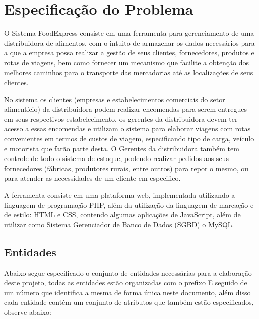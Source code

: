 \documentclass[12pt, onecolumn, titlepage]{article}
\begin{document}
\section{Especificação do Problema}
\label{sect:especificacao}

O Sistema FoodExpress consiste em uma ferramenta para gerenciamento de uma distribuidora de alimentos, com o intuito de armazenar os dados necessários para a que a empresa possa realizar a gestão de seus clientes, fornecedores, produtos e rotas de viagens, bem como fornecer um mecanismo que facilite a obtenção dos melhores caminhos para o transporte das mercadorias até as localizações de seus clientes.

No sistema os clientes (empresas e estabelecimentos comerciais do setor alimentício) da distribuidora podem realizar encomendas para serem entregues em seus respectivos estabelecimento, os gerentes da distribuidora devem ter acesso a essas encomendas e utilizam o sistema para elaborar viagens com rotas convenientes em termos de custos de viagem, especificando tipo de carga, veículo e motorista que farão parte desta. O Gerentes da distribuidora também tem controle de todo o sistema de estoque, podendo realizar pedidos aos seus fornecedores (fábricas, produtores rurais, entre outros) para repor o mesmo, ou para atender as necessidades de um cliente em especifico.

A ferramenta consiste em uma plataforma web, implementada utilizando a linguagem de programação PHP, além da utilização da linguagem de marcação e de estilo: HTML e CSS, contendo algumas aplicações de JavaScript, além de utilizar como Sistema Gerenciador de Banco de Dados (SGBD) o MySQL.

\subsection{Entidades}
\label{sect:entidades}

Abaixo segue especificado o conjunto de entidades necessárias para a elaboração deste projeto, todas as entidades estão organizadas com o prefixo E seguido de um número que identifica a mesma de forma única neste documento, além disso cada entidade contém um conjunto de atributos que também estão especificados, observe abaixo:
\end{document}
